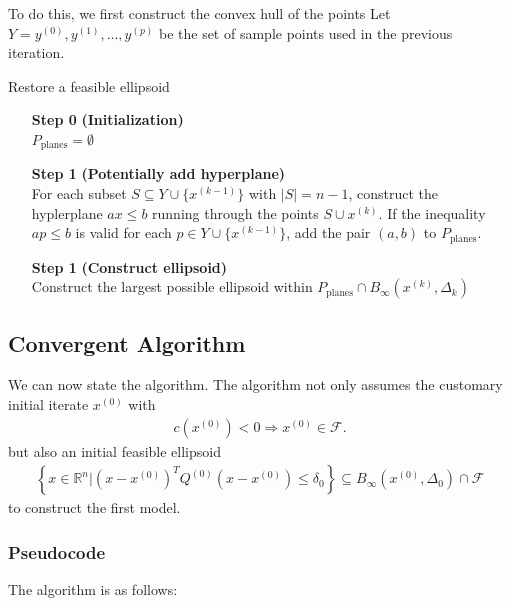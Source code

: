 \documentclass{article}
\theoremstyle{case}
\numberwithin{theorem}{subsection}
\newcommand{\dk}{\Delta_k}
\newcommand{\feasible}{{\mathcal F}}
\newcommand{\Rn}{\mathbb R^n}
\newcommand{\tr}{{ B_{\infty}\left(\xk, \dk\right) }}
\newcommand{\xk}{x^{(k)}}
\newcommand{\xinit}{{x^{(0)}}}
\begin{document}
To do this, we first construct the convex hull of the points 
Let $Y = y^{(0)}, y^{(1)}, \ldots, y^{(p)}$ be the set of sample points used in the previous iteration.

\begin{algorithm}[H]
    \caption{Restore a feasible ellipsoid}
    \label{restore_feasible_ellipsoid}
    \begin{itemize}
        \item[\textbf{Step 0}] \textbf{(Initialization)} \\
            $P_{\textrm{planes}} = \emptyset$
            
        \item[\textbf{Step 1}] \textbf{(Potentially add hyperplane)} \\
	    For each subset $S \subseteq Y \cup \{x^{(k-1)}\}$ with $|S| = n - 1$, construct the hyplerplane $ax\le b$ running through the points $S \cup \xk$.
	    If the inequality $ap \le b$ is valid for each $p \in Y \cup \{x^{(k-1)}\}$, add the pair $(a, b)$ to $P_{\textrm{planes}}$.
	
	\item[\textbf{Step 1}] \textbf{(Construct ellipsoid)} \\
	   Construct the largest possible ellipsoid within $P_{\textrm{planes}} \cap \tr$
    \end{itemize}
\end{algorithm}


\subsection{Convergent Algorithm}
\label{the_algroithm_section}

We can now state the algorithm.
The algorithm not only assumes the customary initial iterate $ \xinit $ with 
\begin{align}
\label{initial_point_is_feasible}
c\left(\xinit\right) < 0 \Longrightarrow \xinit \in \feasible.
\end{align}
but also an initial feasible ellipsoid
\begin{align}
\left\{x \in\Rn | \left(x - \xinit\right)^T Q^{(0)} \left(x - \xinit\right) \le \delta_0 \right\} \subseteq B_{\infty}\left(\xinit, \Delta_{0}\right) \cap \feasible \label{initial_ellipsoid}
\end{align}
to construct the first model.


\subsubsection{Pseudocode}
The algorithm is as follows:
\end{document}

